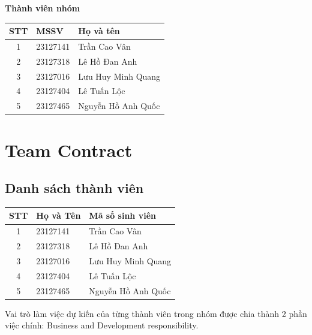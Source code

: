 \documentclass[12pt,a4paper]{article}
\begin{document}
\begin{titlepage}
  \vspace{0.5cm}

  {\Large\bfseries Thành viên nhóm}\par
  \vspace{0.2cm}

  \small
  \begin{tabular}{@{}cll@{}}
    \toprule
    \textbf{STT} & \textbf{MSSV} & \textbf{Họ và tên} \\
    \midrule
    1 & 23127141 & Trần Cao Vân \\
    2 & 23127318 & Lê Hồ Đan Anh \\
    3 & 23127016 & Lưu Huy Minh Quang \\
    4 & 23127404 & Lê Tuấn Lộc \\
    5 & 23127465 & Nguyễn Hồ Anh Quốc \\
    \bottomrule
  \end{tabular}\par
  \normalsize

\end{titlepage}

\newpage
{}
\newpage

\section{Team Contract}
\subsection{Danh sách thành viên}


\vspace{0.25cm}
\def\arraystretch{2.5} %
\setlength{\tabcolsep}{12pt} %
\begin{tabular}{c l l}
\toprule
\textbf{STT} & \textbf{Họ và Tên} & \textbf{Mã số sinh viên} \\
\midrule
1 & 23127141 & Trần Cao Vân \\
2 & 23127318 & Lê Hồ Đan Anh \\
3 & 23127016 & Lưu Huy Minh Quang \\
4 & 23127404 & Lê Tuấn Lộc \\
5 & 23127465 & Nguyễn Hồ Anh Quốc \\
\bottomrule
\end{tabular}
\vspace{0.5cm}

Vai trò làm việc dự kiến của từng thành viên trong nhóm được chia thành 2 phần việc chính: Business and Development responsibility.
\end{document}
